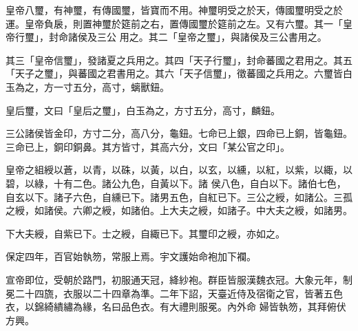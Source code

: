 \begin{pinyinscope}
 皇帝八璽，有神璽，有傳國璽，皆寶而不用。神璽明受之於天，傳國璽明受之於運。皇帝負扆，則置神璽於筵前之右，置傳國璽於筵前之左。又有六璽。其一「皇帝行璽」，封命諸侯及三公
 用之。其二「皇帝之璽」，與諸侯及三公書用之。



 其三「皇帝信璽」，發諸夏之兵用之。其四「天子行璽」，封命蕃國之君用之。其五「天子之璽」，與蕃國之君書用之。其六「天子信璽」，徵蕃國之兵用之。六璽皆白玉為之，方一寸五分，高寸，螭獸鈕。



 皇后璽，文曰「皇后之璽」，白玉為之，方寸五分，高寸，麟鈕。



 三公諸侯皆金印，方寸二分，高八分，龜鈕。七命已上銀，四命已上銅，皆龜鈕。三命已上，銅印銅鼻。其方皆寸，其高六分，文曰「某公官之印」。



 皇帝之組綬以蒼，以青，以硃，以黃，以白，以玄，以纁，以紅，以紫，以緅，以碧，以綠，十有二色。諸公九色，自黃以下。諸
 侯八色，自白以下。諸伯七色，自玄以下。諸子六色，自纁已下。諸男五色，自紅已下。三公之綬，如諸公。三孤之綬，如諸侯。六卿之綬，如諸伯。上大夫之綬，如諸子。中大夫之綬，如諸男。



 下大夫綬，自紫已下。士之綬，自緅已下。其璽印之綬，亦如之。



 保定四年，百官始執笏，常服上焉。宇文護始命袍加下襴。



 宣帝即位，受朝於路門，初服通天冠，絳紗袍。群臣皆服漢魏衣冠。大象元年，制冕二十四旒，衣服以二十四章為準。二年下詔，天臺近侍及宿衛之官，皆著五色衣，以錦綺繢繡為緣，名曰品色衣。有大禮則服冕。內外命
 婦皆執笏，其拜俯伏方興。



\end{pinyinscope}
